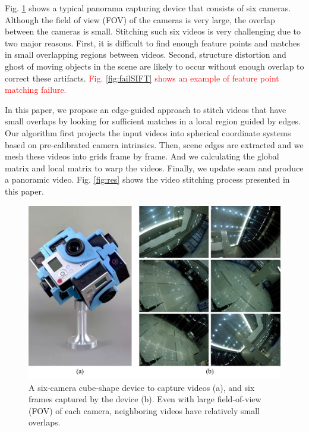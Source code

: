 \documentclass[conference]{IEEEtran}
\begin{document}
Fig. \ref{fig:equipment} shows a typical panorama capturing device that consists of six cameras. 
Although the field of view (FOV) of the cameras is very large, the overlap between the cameras is small. 
Stitching such six videos is very challenging due to two
major reasons. First, it is difficult to find enough feature points and matches in small overlapping regions between videos. 
Second, structure distortion and ghost of moving objects in the scene are likely to occur without enough overlap to correct these artifacts. 
\textcolor{red}{Fig. \ref{fig:failSIFT} shows an example of feature point matching failure.}

In this paper, we propose an edge-guided approach to stitch videos that have small overlaps by looking for sufficient matches in a local region guided by edges. 
Our algorithm first projects the input videos into spherical coordinate systems based on pre-calibrated camera intrinsics. 
Then, scene edges are extracted and we mesh these videos into grids frame by frame.
And we calculating the global matrix and local matrix to warp the videos. Finally, we update seam and produce a panoramic video.
Fig. \ref{fig:res} shows the video stitching process presented in this paper.


\begin{figure}[t]
\centering
\includegraphics[scale=0.36]{picture34.png}
\caption{A six-camera cube-shape device to capture videos (a), and six frames captured by the device (b). Even with large field-of-view (FOV) of each camera, 
neighboring videos have relatively small overlaps. }
\label{fig:equipment}
\end{figure}
\end{document}
